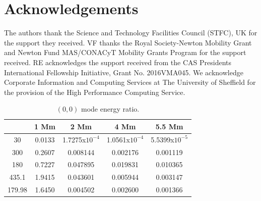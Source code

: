 \documentclass[preprint,authoryear,12pt]{elsarticle}
\begin{document}
\section{Acknowledgements}
 The authors thank the Science and Technology Facilities Council (STFC), UK for the support they received. 
VF thanks the Royal Society-Newton Mobility Grant and Newton Fund MAS/CONACyT Mobility
Grants Program for the support received. RE acknowledges the support received from the CAS Presidents International Fellowship Initiative, Grant No. 2016VMA045. 
We acknowledge Corporate Information and Computing Services at The University of Sheffield for the provision of the High Performance Computing Service.

\begin{thebibliography}{}


%

%
%


\end{thebibliography}





\begin{table}[h]
\centering
\begin{tabular}{c c c c c }
\hline
   &  1 Mm & 2 Mm & 4 Mm & 5.5 Mm \\
\hline
30 &  0.0133 & 1.7275x$10^{-4}$ & 1.0561x$10^{-4}$ & 5.5399x$10^{-5}$ \\
\hline
300 & 0.2607 & 0.008144 & 0.002176 &  0.001119 \\
\hline
180 & 0.7227 & 0.047895 & 0.019831 &  0.010365 \\
\hline
435.1 & 1.9415 & 0.043601 & 0.005944 & 0.003147  \\
\hline
179.98 & 1.6450 & 0.004502 & 0.002600&  0.001366 \\ 
\hline
\hline
\end{tabular} 
\caption{ $(0, 0)$ mode energy ratio.}
\label{Table00mode}
\end{table}
\end{document}
